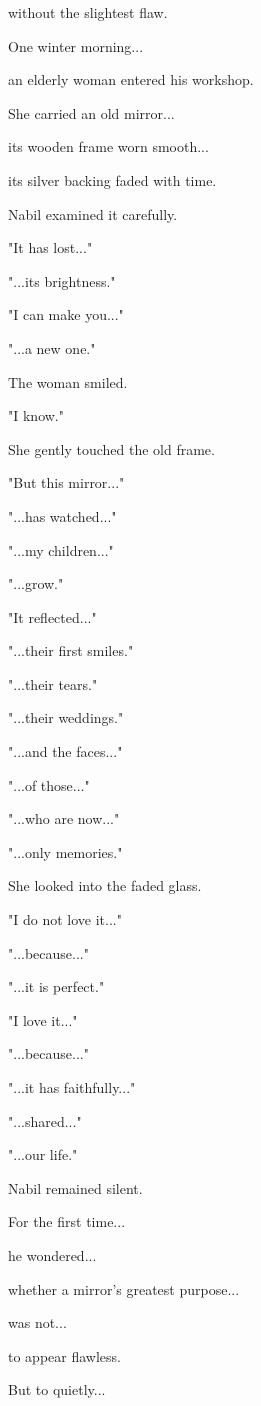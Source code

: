 \documentclass[12pt,openany]{book}
\begin{document}
without the slightest flaw.

One winter morning...

an elderly woman entered his workshop.

She carried an old mirror...

its wooden frame worn smooth...

its silver backing faded with time.

Nabil examined it carefully.

"It has lost..."

"...its brightness."

"I can make you..."

"...a new one."

The woman smiled.

"I know."

She gently touched the old frame.

"But this mirror..."

"...has watched..."

"...my children..."

"...grow."

"It reflected..."

"...their first smiles."

"...their tears."

"...their weddings."

"...and the faces..."

"...of those..."

"...who are now..."

"...only memories."

She looked into the faded glass.

"I do not love it..."

"...because..."

"...it is perfect."

"I love it..."

"...because..."

"...it has faithfully..."

"...shared..."

"...our life."

Nabil remained silent.

For the first time...

he wondered...

whether a mirror's greatest purpose...

was not...

to appear flawless.

But to quietly...
\end{document}
